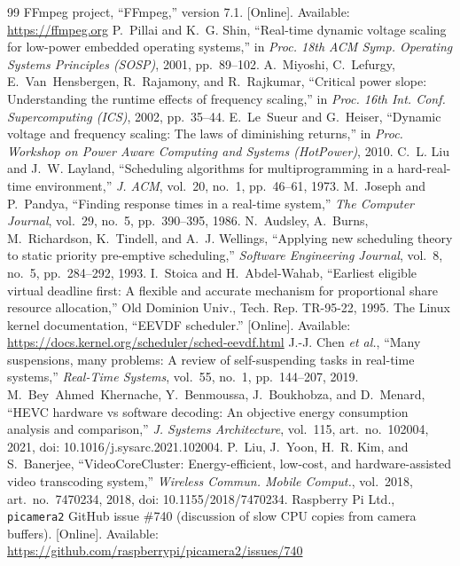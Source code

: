 \documentclass[conference]{IEEEtran}
\begin{document}
\begin{thebibliography}{99}
 FFmpeg project, ``FFmpeg,'' version 7.1. [Online]. Available: \url{https://ffmpeg.org}
 P.~Pillai and K.~G. Shin, ``Real-time dynamic voltage scaling for low-power embedded operating systems,'' in \textit{Proc. 18th ACM Symp. Operating Systems Principles (SOSP)}, 2001, pp.~89--102.
 A.~Miyoshi, C.~Lefurgy, E.~Van~Hensbergen, R.~Rajamony, and R.~Rajkumar, ``Critical power slope: Understanding the runtime effects of frequency scaling,'' in \textit{Proc. 16th Int. Conf. Supercomputing (ICS)}, 2002, pp.~35--44.
 E.~Le~Sueur and G.~Heiser, ``Dynamic voltage and frequency scaling: The laws of diminishing returns,'' in \textit{Proc. Workshop on Power Aware Computing and Systems (HotPower)}, 2010.
 C.~L. Liu and J.~W. Layland, ``Scheduling algorithms for multiprogramming in a hard-real-time environment,'' \textit{J. ACM}, vol.~20, no.~1, pp.~46--61, 1973.
 M.~Joseph and P.~Pandya, ``Finding response times in a real-time system,'' \textit{The Computer Journal}, vol.~29, no.~5, pp.~390--395, 1986.
 N.~Audsley, A.~Burns, M.~Richardson, K.~Tindell, and A.~J. Wellings, ``Applying new scheduling theory to static priority pre-emptive scheduling,'' \textit{Software Engineering Journal}, vol.~8, no.~5, pp.~284--292, 1993.
 I.~Stoica and H.~Abdel-Wahab, ``Earliest eligible virtual deadline first: A flexible and accurate mechanism for proportional share resource allocation,'' Old Dominion Univ., Tech. Rep. TR-95-22, 1995.
 The Linux kernel documentation, ``EEVDF scheduler.'' [Online]. Available: \url{https://docs.kernel.org/scheduler/sched-eevdf.html}
 J.-J. Chen \textit{et al.}, ``Many suspensions, many problems: A review of self-suspending tasks in real-time systems,'' \textit{Real-Time Systems}, vol.~55, no.~1, pp.~144--207, 2019.
 M.~Bey~Ahmed~Khernache, Y.~Benmoussa, J.~Boukhobza, and D.~Menard, ``HEVC hardware vs software decoding: An objective energy consumption analysis and comparison,'' \textit{J. Systems Architecture}, vol.~115, art.~no.~102004, 2021, doi: 10.1016/j.sysarc.2021.102004.
 P.~Liu, J.~Yoon, H.~R. Kim, and S.~Banerjee, ``VideoCoreCluster: Energy-efficient, low-cost, and hardware-assisted video transcoding system,'' \textit{Wireless Commun. Mobile Comput.}, vol.~2018, art.~no.~7470234, 2018, doi: 10.1155/2018/7470234.
 Raspberry Pi Ltd., \texttt{picamera2} GitHub issue \#740 (discussion of slow CPU copies from camera buffers). [Online]. Available: \url{https://github.com/raspberrypi/picamera2/issues/740}

\end{thebibliography}
\end{document}
